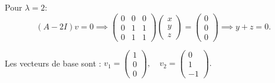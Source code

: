 \documentclass[12pt]{report}
\begin{document}
\noindent Pour $\lambda = 2$:
\[
    (A - 2I)v = 0 \implies
    \begin{pmatrix} 0 & 0 & 0 \\ 0 & 1 & 1 \\ 0 & 1 & 1 \end{pmatrix}
    \begin{pmatrix}x\\y\\z\end{pmatrix} =
    \begin{pmatrix}0\\0\\0\end{pmatrix} \implies y + z = 0.
\]

\noindent Les vecteurs de base sont : $v_1 = \begin{pmatrix}1\\0\\0\end{pmatrix}, \quad v_2 = \begin{pmatrix}0\\1\\-1\end{pmatrix}.$
\end{document}
